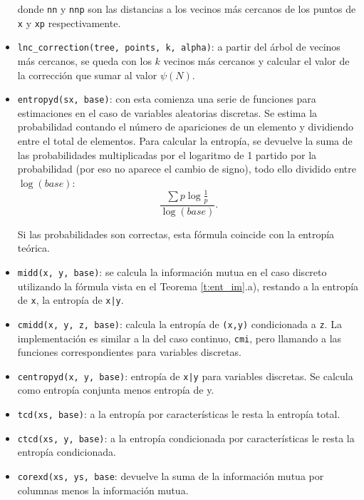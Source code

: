 \documentclass[12pt,a4paper]{report} %
\theoremstyle{definition}
\begin{document}
\begin{itemize}
donde \texttt{nn} y \texttt{nnp} son las distancias a los vecinos más cercanos de los puntos de \texttt{x} y \texttt{xp} respectivamente.

\item \texttt{lnc\_correction(tree, points, k, alpha)}: a partir del árbol de vecinos más cercanos, se queda con los $k$ vecinos más cercanos y calcular el valor de la corrección que sumar al valor $\psi(N)$.

\item \texttt{entropyd(sx, base)}: con esta comienza una serie de funciones para estimaciones en el caso de variables aleatorias discretas. Se estima la probabilidad contando el número de apariciones de un elemento y dividiendo entre el total de elementos. Para calcular la entropía, se devuelve la suma de las probabilidades multiplicadas por el logaritmo de 1 partido por la probabilidad (por eso no aparece el cambio de signo), todo ello dividido entre $\log (base)$:\[
\frac{\sum p \log \frac{1}{p}}{\log(base)}.
\]

Si las probabilidades son correctas, esta fórmula coincide con la entropía teórica.

\item \texttt{midd(x, y, base)}: se calcula la información mutua en el caso discreto utilizando la fórmula vista en el Teorema \ref{t:ent_im}.a), restando a la entropía de \texttt{x}, la entropía de \texttt{x|y}.

\item \texttt{cmidd(x, y, z, base)}: calcula la entropía de \texttt{(x,y)} condicionada a \texttt{z}. La implementación es similar a la del caso continuo, \texttt{cmi}, pero llamando a las funciones correspondientes para variables discretas.

\item \texttt{centropyd(x, y, base)}: entropía de \texttt{x|y} para variables discretas. Se calcula como entropía conjunta menos entropía de y.

\item \texttt{tcd(xs, base)}: a la entropía por características le resta la entropía total.

\item \texttt{ctcd(xs, y, base)}:  a la entropía condicionada por características le resta la entropía condicionada.

\item \texttt{corexd(xs, ys, base}: devuelve la suma de la información mutua por columnas menos la información mutua.


\end{itemize}
\end{document}

